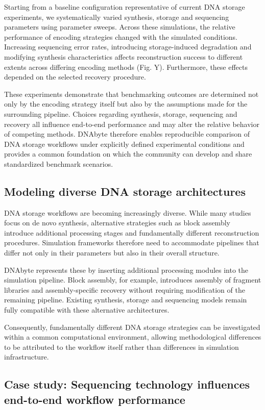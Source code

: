 \documentclass[pdflatex,sn-mathphys-num]{sn-jnl}%
\theoremstyle{thmstyleone}%
\theoremstyle{thmstyletwo}%
\theoremstyle{thmstylethree}%
\begin{document}
Starting from a baseline configuration representative of current DNA storage experiments, we systematically varied synthesis, storage and sequencing parameters using parameter sweeps. Across these simulations, the relative performance of encoding strategies changed with the simulated conditions. Increasing sequencing error rates, introducing storage-induced degradation and modifying synthesis characteristics affects reconstruction success to different extents across differing encoding methods (Fig. Y). Furthermore, these effects depended on the selected recovery procedure.

These experiments demonstrate that benchmarking outcomes are determined not only by the encoding strategy itself but also by the assumptions made for the surrounding pipeline. Choices regarding synthesis, storage, sequencing and recovery all influence end-to-end performance and may alter the relative behavior of competing methods. DNAbyte therefore enables reproducible comparison of DNA storage workflows under explicitly defined experimental conditions and provides a common foundation on which the community can develop and share standardized benchmark scenarios.

\subsection{Modeling diverse DNA storage architectures}
DNA storage workflows are becoming increasingly diverse. While many studies focus on de novo synthesis, alternative strategies such as block assembly introduce additional processing stages and fundamentally different reconstruction procedures. Simulation frameworks therefore need to accommodate pipelines that differ not only in their parameters but also in their overall structure.

DNAbyte represents these by inserting additional processing modules into the simulation pipeline. Block assembly, for example, introduces assembly of fragment libraries and assembly-specific recovery without requiring modification of the remaining pipeline. Existing synthesis, storage and sequencing models remain fully compatible with these alternative architectures.

Consequently, fundamentally different DNA storage strategies can be investigated within a common computational environment, allowing methodological differences to be attributed to the workflow itself rather than differences in simulation infrastructure.

\subsection{Case study: Sequencing technology influences end-to-end workflow performance}
\end{document}
